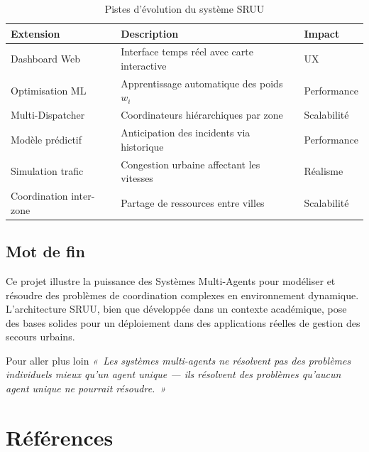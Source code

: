 \documentclass[12pt, a4paper]{report}
\begin{document}
\begin{table}[H]
\centering
\caption{Pistes d'évolution du système SRUU}
\begin{tabularx}{\textwidth}{lXl}
\toprule
\rowcolor{NavyCard!15}
\color{CyanNeon}Extension & \color{CyanNeon}Description & \color{CyanNeon}Impact \\
\midrule
Dashboard Web          & Interface temps réel avec carte interactive   & UX \\
Optimisation ML        & Apprentissage automatique des poids $w_i$     & Performance \\
Multi-Dispatcher       & Coordinateurs hiérarchiques par zone          & Scalabilité \\
Modèle prédictif       & Anticipation des incidents via historique     & Performance \\
Simulation trafic      & Congestion urbaine affectant les vitesses     & Réalisme \\
Coordination inter-zone & Partage de ressources entre villes           & Scalabilité \\
\bottomrule
\end{tabularx}
\end{table}

\section{Mot de fin}

Ce projet illustre la puissance des Systèmes Multi-Agents pour modéliser et résoudre
des problèmes de coordination complexes en environnement dynamique. L'architecture SRUU,
bien que développée dans un contexte académique, pose des bases solides pour un
déploiement dans des applications réelles de gestion des secours urbains.

\begin{infobox}{Pour aller plus loin}
\textit{«~Les systèmes multi-agents ne résolvent pas des problèmes individuels mieux
qu'un agent unique --- ils résolvent des problèmes qu'aucun agent unique ne pourrait
résoudre.~»}
\end{infobox}

\chapter*{Références}
\end{document}
